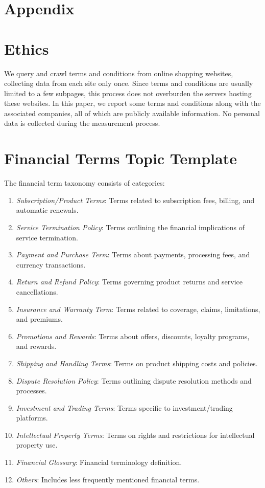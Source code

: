 
\appendix


\section*{Appendix}
\label{sec:appendix}


\section{Ethics}


We query and crawl terms and conditions from online shopping websites, collecting data from each site only once. Since terms and conditions are usually limited to a few subpages, this process does not overburden the servers hosting these websites. In this paper, we report some terms and conditions along with the associated companies, all of which are publicly available information. No personal data is collected during the measurement process.


\section{Financial Terms Topic Template}
\label{sec:appendix_finaincial_terms}


The financial term taxonomy consists of \financialcnt categories:

\begin{enumerate}
    \item \textit{Subscription/Product Terms}: Terms related to subscription fees, billing, and automatic renewals.

    \item \textit{Service Termination Policy}: Terms outlining the financial implications of service termination.
    \item \textit{Payment and Purchase Term}: Terms about payments, processing fees, and currency transactions.
    \item \textit{Return and Refund Policy}: Terms governing product returns and service cancellations.
    \item \textit{Insurance and Warranty Term}: Terms related to coverage, claims, limitations, and premiums.
    \item \textit{Promotions and Rewards}: Terms about offers, discounts, loyalty programs, and rewards.
    \item \textit{Shipping and Handling Terms}: Terms on product shipping costs and policies.
    \item \textit{Dispute Resolution Policy}: Terms outlining dispute resolution methods and processes.
    \item \textit{Investment and Trading Terms}: Terms specific to investment/trading platforms.
    \item \textit{Intellectual Property Terms}: Terms on rights and restrictions for intellectual property use.
    \item \textit{Financial Glossary}: Financial terminology definition.
    \item \textit{Others}: Includes less frequently mentioned financial terms.
\end{enumerate}

